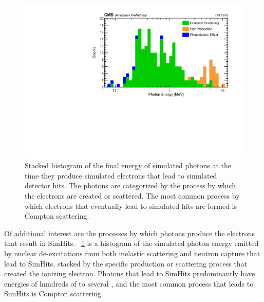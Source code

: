 \begin{figure}[htbp]
	\centering
	\includegraphics[width=\dummyFigWidth]{figures/neutron/neut_gamma_proc_energy.pdf}
	\caption{Stacked histogram of the final energy of simulated photons at the time they produce simulated electrons that lead to simulated detector hits. The photons are categorized by the process by which the electrons are created or scattered. The most common process by which electrons that eventually lead to simulated hits are formed is Compton scattering.}
	\label{fig:electron_proc}
\end{figure}

Of additional interest are the processes by which photons produce the electrons that result in SimHits. \FigDot~\ref{fig:electron_proc} is a histogram of the simulated photon energy emitted by nuclear de-excitations from both inelastic scattering and neutron capture that lead to SimHits, stacked by the specific production or scattering process that created the ionizing electron. Photons that lead to SimHits predominantly have energies of hundreds of \keVns to several \MeVns, and the most common process that leads to SimHits is Compton scattering.

